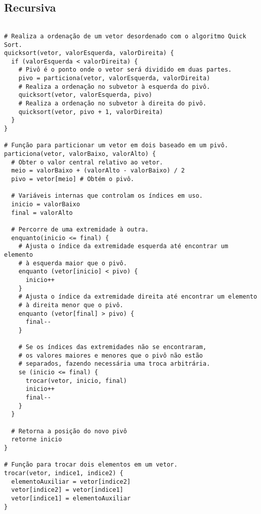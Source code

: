 \subsection{Recursiva}
\begin{verbatim}

# Realiza a ordenação de um vetor desordenado com o algoritmo Quick Sort.
quicksort(vetor, valorEsquerda, valorDireita) { 
  if (valorEsquerda < valorDireita) {
    # Pivô é o ponto onde o vetor será dividido em duas partes.
    pivo = particiona(vetor, valorEsquerda, valorDireita)
    # Realiza a ordenação no subvetor à esquerda do pivô.
    quicksort(vetor, valorEsquerda, pivo)
    # Realiza a ordenação no subvetor à direita do pivô.
    quicksort(vetor, pivo + 1, valorDireita) 
  }
}

# Função para particionar um vetor em dois baseado em um pivô.
particiona(vetor, valorBaixo, valorAlto) { 
  # Obter o valor central relativo ao vetor.
  meio = valorBaixo + (valorAlto - valorBaixo) / 2
  pivo = vetor[meio] # Obtém o pivô.

  # Variáveis internas que controlam os índices em uso.
  inicio = valorBaixo
  final = valorAlto 
  
  # Percorre de uma extremidade à outra.
  enquanto(inicio <= final) { 
    # Ajusta o índice da extremidade esquerda até encontrar um elemento 
    # à esquerda maior que o pivô.
    enquanto (vetor[inicio] < pivo) { 
      inicio++
    }
    # Ajusta o índice da extremidade direita até encontrar um elemento 
    # à direita menor que o pivô.
    enquanto (vetor[final] > pivo) {
      final--
    }

    # Se os índices das extremidades não se encontraram, 
    # os valores maiores e menores que o pivô não estão
    # separados, fazendo necessária uma troca arbitrária.
    se (inicio <= final) {
      trocar(vetor, inicio, final)
      inicio++
      final--
    }
  }
  
  # Retorna a posição do novo pivô
  retorne inicio
}
   
# Função para trocar dois elementos em um vetor.
trocar(vetor, indice1, indice2) { 
  elementoAuxiliar = vetor[indice2]
  vetor[indice2] = vetor[indice1]
  vetor[indice1] = elementoAuxiliar
}
\end{verbatim}

